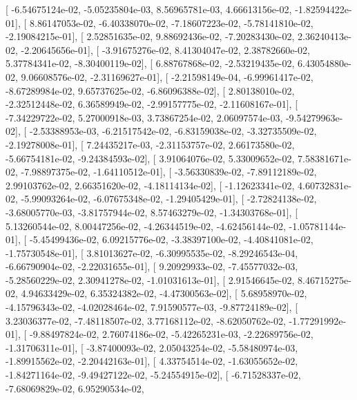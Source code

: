 \documentclass{article}
\begin{document}
       [ -6.54675124e-02,  -5.05235804e-03,   8.56965781e-03,
          4.66613156e-02,  -1.82594422e-01],
       [  8.86147053e-02,  -6.40338070e-02,  -7.18607223e-02,
         -5.78141810e-02,  -2.19084215e-01],
       [  2.52851635e-02,   9.88692436e-02,  -7.20283430e-02,
          2.36240413e-02,  -2.20645656e-01],
       [ -3.91675276e-02,   8.41304047e-02,   2.38782660e-02,
          5.37784341e-02,  -8.30400119e-02],
       [  6.88767868e-02,  -2.53219435e-02,   6.43054880e-02,
          9.06608576e-02,  -2.31169627e-01],
       [ -2.21598149e-04,  -6.99961417e-02,  -8.67289984e-02,
          9.65737625e-02,  -6.86096388e-02],
       [  2.80138010e-02,  -2.32512448e-02,   6.36589949e-02,
         -2.99157775e-02,  -2.11608167e-01],
       [ -7.34229722e-02,   5.27000918e-03,   3.73867254e-02,
          2.06097574e-03,  -9.54279963e-02],
       [ -2.53388953e-03,  -6.21517542e-02,  -6.83159038e-02,
         -3.32735509e-02,  -2.19278008e-01],
       [  7.24435217e-03,  -2.31153757e-02,   2.66173580e-02,
         -5.66754181e-02,  -9.24384593e-02],
       [  3.91064076e-02,   5.33009652e-02,   7.58381671e-02,
         -7.98897375e-02,  -1.64110512e-01],
       [ -3.56330839e-02,  -7.89112189e-02,   2.99103762e-02,
          2.66351620e-02,  -4.18114134e-02],
       [ -1.12623341e-02,   4.60732831e-02,  -5.99093264e-02,
         -6.07675348e-02,  -1.29405429e-01],
       [ -2.72824138e-02,  -3.68005770e-03,  -3.81757944e-02,
          8.57463279e-02,  -1.34303768e-01],
       [  5.13260544e-02,   8.00447256e-02,  -4.26344519e-02,
         -4.62456144e-02,  -1.05781144e-01],
       [ -5.45499436e-02,   6.09215776e-02,  -3.38397100e-02,
         -4.40841081e-02,  -1.75730548e-01],
       [  3.81013627e-02,  -6.30995535e-02,  -8.29246543e-04,
         -6.66790904e-02,  -2.22031655e-01],
       [  9.20929933e-02,  -7.45577032e-03,  -5.28560229e-02,
          2.30941278e-02,  -1.01031613e-01],
       [  2.91546645e-02,   8.46715275e-02,   4.94633429e-02,
          6.35324382e-02,  -4.47300563e-02],
       [  5.68958970e-02,  -4.15796343e-02,  -4.02028464e-02,
          7.91590577e-03,  -9.87724189e-02],
       [  3.23036377e-02,  -7.48118507e-02,   3.77168112e-02,
         -8.62050762e-02,  -1.77291992e-01],
       [ -9.88497824e-02,   2.76074186e-02,  -5.42265231e-03,
         -2.22689756e-02,  -1.31706311e-01],
       [ -3.87400093e-02,   2.05043254e-02,  -5.58480974e-03,
         -1.89915562e-02,  -2.20442163e-01],
       [  4.33754514e-02,  -1.63055652e-02,  -1.84271164e-02,
         -9.49427122e-02,  -5.24554915e-02],
       [ -6.71528337e-02,  -7.68069829e-02,   6.95290534e-02,
\end{document}
